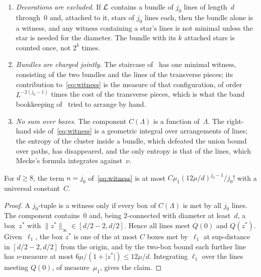 \documentclass[11pt,letterpaper]{article}
\begin{document}
\begin{remark}
\label{rem:right}
\begin{enumerate}
  \item \emph{Decorations are excluded.} If $\mathcal L$ contains a bundle of $j_0$ lines of length~$d$ through~$0$ and, attached to it, stars of $j_0$ lines each, then the bundle alone is a witness, and any witness containing a star's lines is not minimal unless the star is needed for the diameter. The bundle with its $k$ attached stars is counted once, not $2^k$ times.
  \item \emph{Bundles are charged jointly.} The staircase of~\cite[Section~4]{PS26} has one minimal witness, consisting of the two bundles and the lines of the transverse pieces; its contribution to~\eqref{eq:witness} is the measure of that configuration, of order $L^{-2(j_0-1)}$ times the cost of the transverse pieces, which is what the band bookkeeping of~\cite{PS26} tried to arrange by hand.
  \item \emph{No sum over boxes.} The component $C(\Lambda)$ is a function of~$\Lambda$. The right-hand side of~\eqref{eq:witness} is a geometric integral over arrangements of lines; the entropy of the cluster inside a bundle, which defeated the union bound over paths, has disappeared, and the only entropy is that of the lines, which Mecke's formula integrates against~$\nu$.
\end{enumerate}
\end{remark}

\begin{lemma}[The term $n=j_0$]
\label{lem:bundleterm}
For $d\ge8$, the term $n=j_0$ of~\eqref{eq:witness} is at most $C\mu_1(12\mu/d)^{j_0-1}/j_0!$ with a universal constant~$C$.
\end{lemma}

\begin{proof}
A $j_0$-tuple is a witness only if every box of $C(\Lambda)$ is met by all $j_0$ lines. The component contains~$0$ and, being $2$-connected with diameter at least~$d$, a box~$z^*$ with $\lVert z^*\rVert_\infty\in[d/2-2,d/2]$. Hence all lines meet $Q(0)$ and $Q(z^*)$. Given~$\ell_1$, the box $z^*$ is one of the at most $C$ boxes met by~$\ell_1$ at sup-distance in $[d/2-2,d/2]$ from the origin, and by the two-box bound each further line has $\nu$-measure at most $6\mu/(1+\lvert z^*\rvert)\le12\mu/d$. Integrating $\ell_1$ over the lines meeting $Q(0)$, of measure~$\mu_1$, gives the claim.
\end{proof}
\end{document}
